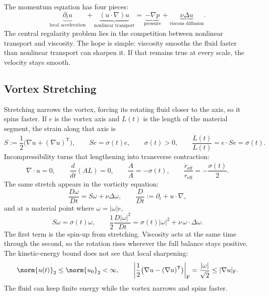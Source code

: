 
The momentum equation has four pieces:
\[
  \underbrace{\partial_t u}_{\text{local acceleration}}
  +
  \underbrace{(u\cdot\nabla)u}_{\text{nonlinear transport}}
  =
  \underbrace{-\nabla p}_{\text{pressure}}
  +
  \underbrace{\nu\Delta u}_{\text{viscous diffusion}}.
\]
The central regularity problem lies in the competition between nonlinear transport and viscosity.
The hope is simple: viscosity smooths the fluid faster than nonlinear transport can sharpen it.
If that remains true at every scale, the velocity stays smooth.

\subsection{Vortex Stretching}\label{sub:ThePerfectlyStretchingVortex}

Stretching narrows the vortex, forcing its rotating fluid closer to the axis, so it spins faster.
If \(e\) is the vortex axis and \(L(t)\) is the length of the material segment, the strain along that axis is
\[
  S:=\frac12\bigl(\nabla u+(\nabla u)^{\mathsf T}\bigr),
  \qquad
  Se=\sigma(t)e,
  \qquad
  \sigma(t)>0,
  \qquad
  \frac{\dot L(t)}{L(t)}
  =
  e\cdot Se
  =
  \sigma(t).
\]
Incompressibility turns that lengthening into transverse contraction:
\[
  \nabla\cdot u=0,
  \qquad
  \frac{d}{dt}(A L)=0,
  \qquad
  \frac{\dot A}{A}=-\sigma(t),
  \qquad
  \frac{\dot r_{\mathrm{eff}}}{r_{\mathrm{eff}}}
  =
  -\frac{\sigma(t)}{2}.
\]
The same stretch appears in the vorticity equation:
\[
  \frac{D\omega}{Dt}
  =
  S\omega+\nu\Delta\omega,
  \qquad
  \frac{D}{Dt}
  :=
  \partial_t+u\cdot\nabla,
\]
and at a material point where \(\omega=|\omega|e\),
\[
  S\omega
  =
  \sigma(t)\omega,
  \qquad
  \frac12\frac{D|\omega|^2}{Dt}
  =
  \sigma(t)|\omega|^2
  +
  \nu\,\omega\cdot\Delta\omega.
\]
The first term is the spin-up from stretching. Viscosity acts at the same time through the second, so the rotation rises wherever the full balance stays positive.
The kinetic-energy bound does not see that local sharpening:
\[
  \norm{u(t)}_2
  \leq
  \norm{u_0}_2
  <\infty,
  \qquad
  \left|\frac12\bigl(\nabla u-(\nabla u)^{\mathsf T}\bigr)\right|_{\mathrm F}
  =
  \frac{|\omega|}{\sqrt2}
  \leq
  |\nabla u|_{\mathrm F}.
\]
The fluid can keep finite energy while the vortex narrows and spins faster.

